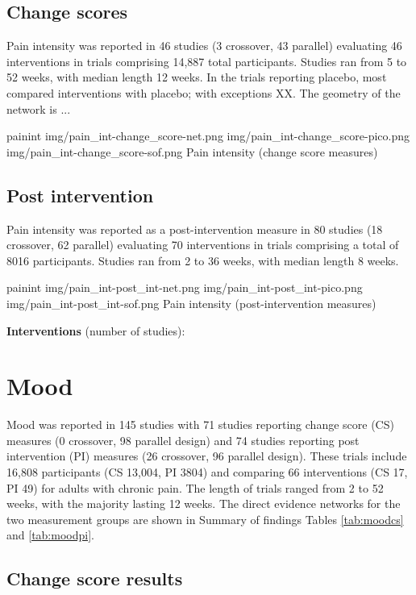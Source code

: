 \documentclass{report}\usepackage[]{graphicx}\usepackage[]{color}
\begin{document}
\subsection{Change scores}

Pain intensity was reported in 46 studies (3 crossover, 43 parallel) evaluating 46 interventions in trials comprising 14,887 total participants. Studies ran from 5 to 52 weeks, with median length 12 weeks. In the trials reporting placebo, most compared interventions with placebo; with exceptions XX. The geometry of the network is ...



\soffignew
{painint}
{img/pain_int-change_score-net.png}
{img/pain_int-change_score-pico.png}
{img/pain_int-change_score-sof.png}
{Pain intensity (change score measures)}


\subsection{Post intervention}


Pain intensity was reported as a post-intervention measure in 80 studies (18 crossover, 62 parallel) evaluating 70 interventions in trials comprising a total of 8016 participants. Studies ran from 2 to 36 weeks, with median length 8 weeks.


\soffignew
{painint}
{img/pain_int-post_int-net.png}
{img/pain_int-post_int-pico.png}
{img/pain_int-post_int-sof.png}
{Pain intensity (post-intervention measures)}


\textbf{Interventions} (number of studies):

\section{Mood}

Mood was reported in 145 studies with 71 studies reporting change score (CS) measures (0 crossover, 98 parallel design) and 74 studies reporting post intervention (PI) measures (26 crossover, 96 parallel design). These trials include 16,808 participants (CS 13,004, PI 3804) and comparing 66 interventions (CS 17, PI 49) for adults with chronic pain. The length of trials ranged from 2 to 52 weeks, with the majority lasting 12 weeks. The direct evidence networks for the two measurement groups are shown in Summary of findings Tables \ref{tab:moodcs} and \ref{tab:moodpi}.

\subsection{Change score results}
\end{document}
